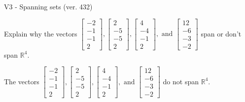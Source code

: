 \begin{exercise}
  \begin{exerciseTitle}V3 - Spanning sets (ver. 432)\end{exerciseTitle}
  \begin{exerciseStatement}
    Explain why the vectors \(\left[\begin{array}{r}
-2 \\
-1 \\
-1 \\
2
\end{array}\right] , \left[\begin{array}{r}
2 \\
-5 \\
-5 \\
2
\end{array}\right] , \left[\begin{array}{r}
4 \\
-4 \\
-1 \\
2
\end{array}\right] , \text{ and } \left[\begin{array}{r}
12 \\
-6 \\
-3 \\
-2
\end{array}\right]\) span or don't span \(\mathbb{R}^4\). 
	


  \end{exerciseStatement}
  \begin{exerciseAnswer}
   The vectors \(\left[\begin{array}{r}
-2 \\
-1 \\
-1 \\
2
\end{array}\right] , \left[\begin{array}{r}
2 \\
-5 \\
-5 \\
2
\end{array}\right] , \left[\begin{array}{r}
4 \\
-4 \\
-1 \\
2
\end{array}\right] , \text{ and } \left[\begin{array}{r}
12 \\
-6 \\
-3 \\
-2
\end{array}\right]\) 
  	 do not  
	span \(\mathbb{R}^4\).
  


  \end{exerciseAnswer}
\end{exercise}